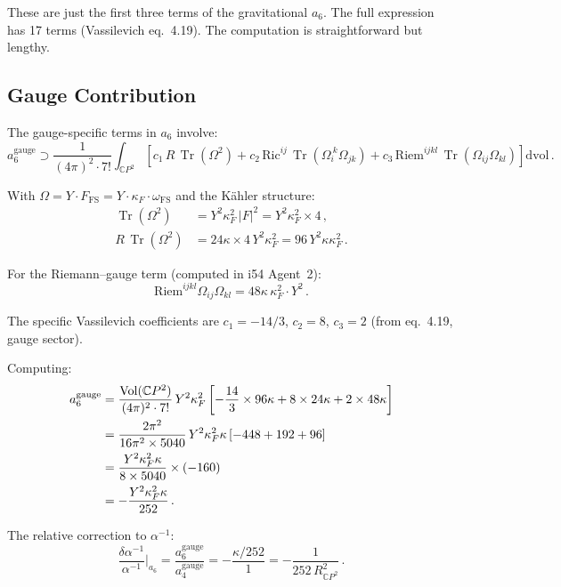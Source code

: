\documentclass[11pt,a4paper]{article}
\newcommand{\Tr}{\operatorname{Tr}}
\newcommand{\CP}{\mathbb{C}P}
\begin{document}
These are just the first three terms of the gravitational $a_6$. The full expression has 17 terms (Vassilevich eq.~4.19). The computation is straightforward but lengthy.

\subsection{Gauge Contribution}

The gauge-specific terms in $a_6$ involve:
\begin{equation}
a_6^{\mathrm{gauge}} \supset \frac{1}{(4\pi)^2 \cdot 7!}\int_{\CP^2}\left[c_1\,R\,\Tr(\Omega^2) + c_2\,\mathrm{Ric}^{ij}\,\Tr(\Omega_i^{\ k}\Omega_{jk}) + c_3\,\mathrm{Riem}^{ijkl}\,\Tr(\Omega_{ij}\Omega_{kl})\right]\mathrm{dvol}\,.
\end{equation}

With $\Omega = Y \cdot F_{\mathrm{FS}} = Y \cdot \kappa_F \cdot \omega_{\mathrm{FS}}$ and the K\"ahler structure:
\begin{align}
\Tr(\Omega^2) &= Y^2 \kappa_F^2\,|F|^2 = Y^2\kappa_F^2 \times 4\,, \\
R\,\Tr(\Omega^2) &= 24\kappa \times 4\,Y^2\kappa_F^2 = 96\,Y^2\kappa\kappa_F^2\,.
\end{align}

For the Riemann--gauge term (computed in i54 Agent~2):
\begin{equation}
\mathrm{Riem}^{ijkl}\Omega_{ij}\Omega_{kl} = 48\kappa\,\kappa_F^2 \cdot Y^2\,.
\end{equation}

The specific Vassilevich coefficients are $c_1 = -14/3$, $c_2 = 8$, $c_3 = 2$ (from eq.~4.19, gauge sector).

Computing:
\begin{align}
a_6^{\mathrm{gauge}} &= \frac{\mathrm{Vol}(\CP^2)}{(4\pi)^2 \cdot 7!}\,Y^2\kappa_F^2\left[-\frac{14}{3} \times 96\kappa + 8 \times 24\kappa + 2 \times 48\kappa\right] \notag\\
&= \frac{2\pi^2}{16\pi^2 \times 5040}\,Y^2\kappa_F^2\kappa\left[-448 + 192 + 96\right] \notag\\
&= \frac{Y^2\kappa_F^2\kappa}{8 \times 5040}\times(-160) \notag\\
&= -\frac{Y^2\kappa_F^2\kappa}{252}\,.
\end{align}

The relative correction to $\alpha^{-1}$:
\begin{equation}
\frac{\delta\alpha^{-1}}{\alpha^{-1}}\bigg|_{a_6} = \frac{a_6^{\mathrm{gauge}}}{a_4^{\mathrm{gauge}}} = -\frac{\kappa/252}{1} = -\frac{1}{252\,R_{\CP^2}^2}\,.
\end{equation}
\end{document}
